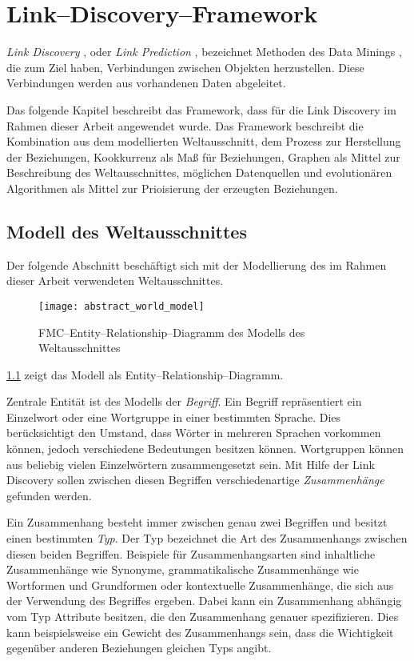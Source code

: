\chapter{Link--Discovery--Framework}

\emph{Link Discovery} \cite{na2011, vbgk2009}, oder \emph{Link Prediction} \cite{twak2003, nk2007}, bezeichnet Methoden des Data Minings \cite{hkp2012}, die zum Ziel haben, Verbindungen zwischen Objekten herzustellen. Diese Verbindungen werden aus vorhandenen Daten abgeleitet.

Das folgende Kapitel beschreibt das Framework, dass für die Link Discovery im Rahmen dieser Arbeit angewendet wurde. Das Framework beschreibt die Kombination aus dem modellierten Weltausschnitt, dem Prozess zur Herstellung der Beziehungen, Kookkurrenz als Maß für Beziehungen, Graphen als Mittel zur Beschreibung des Weltausschnittes, möglichen Datenquellen und evolutionären Algorithmen als Mittel zur Prioisierung der erzeugten Beziehungen.

\section{Modell des Weltausschnittes}
\label{world_model}

Der folgende Abschnitt beschäftigt sich mit der Modellierung des im Rahmen dieser Arbeit verwendeten Weltausschnittes. 

\begin{figure}
\centering
\texttt{[image: abstract\_world\_model]}
\caption{FMC--Entity--Relationship--Diagramm des Modells des Weltausschnittes}
\label{fig:world_model}
\end{figure}

\cref{fig:world_model} zeigt das Modell als Entity--Relationship--Diagramm.

Zentrale Entität ist des Modells der \emph{Begriff}. Ein Begriff repräsentiert ein Einzelwort oder eine Wortgruppe in einer bestimmten Sprache. Dies berücksichtigt den Umstand, dass Wörter in mehreren Sprachen vorkommen können, jedoch verschiedene Bedeutungen besitzen können. Wortgruppen können aus beliebig vielen Einzelwörtern zusammengesetzt sein. Mit Hilfe der Link Discovery sollen zwischen diesen Begriffen verschiedenartige \emph{Zusammenhänge} gefunden werden.

Ein Zusammenhang besteht immer zwischen genau zwei Begriffen und besitzt einen bestimmten \emph{Typ}. Der Typ bezeichnet die Art des Zusammenhangs zwischen diesen beiden Begriffen. Beispiele für Zusammenhangsarten sind inhaltliche Zusammenhänge wie Synonyme, grammatikalische Zusammenhänge wie Wortformen und Grundformen oder kontextuelle Zusammenhänge, die sich aus der Verwendung des Begriffes ergeben. Dabei kann ein Zusammenhang abhängig vom Typ Attribute besitzen, die den Zusammenhang genauer spezifizieren. Dies kann beispielsweise ein Gewicht des Zusammenhangs sein, dass die Wichtigkeit gegenüber anderen Beziehungen gleichen Typs angibt.

